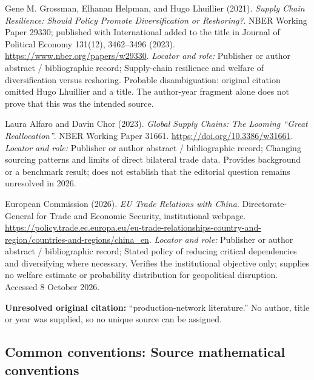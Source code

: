 \documentclass[11pt,a4paper]{article}
\begin{document}
\begin{enumerate}[label={[S\arabic*]},leftmargin=*]

\item Gene M. Grossman, Elhanan Helpman, and Hugo Lhuillier (2021). \emph{Supply Chain Resilience: Should Policy Promote Diversification or Reshoring?}. NBER Working Paper 29330; published with International added to the title in Journal of Political Economy 131(12), 3462–3496 (2023). \url{https://www.nber.org/papers/w29330}.
\textit{Locator and role:} Publisher or author abstract / bibliographic record; Supply-chain resilience and welfare of diversification versus reshoring. Probable disambiguation: original citation omitted Hugo Lhuillier and a title. The author-year fragment alone does not prove that this was the intended source.

\item Laura Alfaro and Davin Chor (2023). \emph{Global Supply Chains: The Looming “Great Reallocation”}. NBER Working Paper 31661. \url{https://doi.org/10.3386/w31661}.
\textit{Locator and role:} Publisher or author abstract / bibliographic record; Changing sourcing patterns and limits of direct bilateral trade data. Provides background or a benchmark result; does not establish that the editorial question remains unresolved in 2026.

\item European Commission (2026). \emph{EU Trade Relations with China}. Directorate-General for Trade and Economic Security, institutional webpage. \url{https://policy.trade.ec.europa.eu/eu-trade-relationships-country-and-region/countries-and-regions/china_en}.
\textit{Locator and role:} Publisher or author abstract / bibliographic record; Stated policy of reducing critical dependencies and diversifying where necessary. Verifies the institutional objective only; supplies no welfare estimate or probability distribution for geopolitical disruption. Accessed 8 October 2026.

\item \textbf{Unresolved original citation:} ``production-network literature.'' No author, title or year was supplied, so no unique source can be assigned.

\end{enumerate}

\subsection*{Common conventions: Source mathematical conventions}
\end{document}
